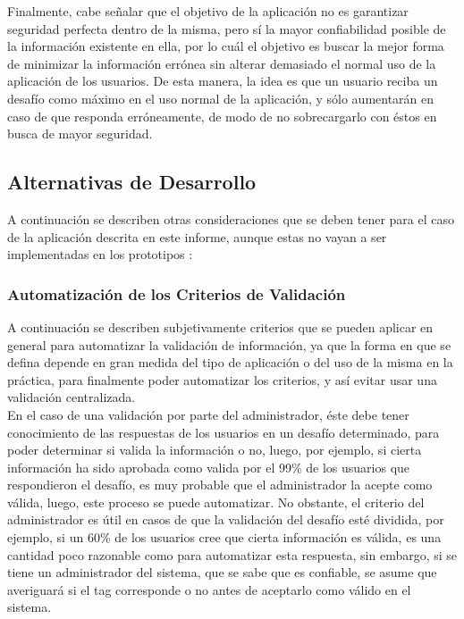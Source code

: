 \documentclass[10pt,letterpaper]{article}
\begin{document}
Finalmente, cabe señalar que el objetivo de la aplicación no es garantizar seguridad perfecta dentro de la misma, pero sí la mayor confiabilidad posible de la información existente en ella, por lo cuál el objetivo es buscar la mejor forma de minimizar la información errónea sin alterar demasiado el normal uso de la aplicación de los usuarios. De esta manera, la idea es que un usuario reciba un desafío como máximo en el uso normal de la aplicación, y sólo aumentarán en caso de que responda erróneamente, de modo de no sobrecargarlo con éstos en busca de mayor seguridad.

\subsection{Alternativas de Desarrollo}

A continuación se describen otras consideraciones que se deben tener para el caso de la aplicación descrita en este informe, aunque estas no vayan a ser implementadas en los prototipos :\\

\subsubsection{Automatización de los Criterios de Validación}

A continuación se describen subjetivamente criterios que se pueden aplicar en general para automatizar la validación de información, ya que la forma en que se defina depende en gran medida del tipo de aplicación o del uso de la misma en la práctica, para finalmente poder automatizar los criterios, y así evitar usar una validación centralizada.\\

En el caso de una validación por parte del administrador, éste debe tener conocimiento de las respuestas de los usuarios en un desafío determinado, para poder determinar si valida la información o no, luego, por ejemplo, si cierta información ha sido aprobada como valida por el 99\% de los usuarios que respondieron el desafío, es muy probable que el administrador la acepte como válida, luego, este proceso se puede automatizar. No obstante, el criterio del administrador es útil en casos de que la validación del desafío esté dividida, por ejemplo, si un 60\% de los usuarios cree que cierta información es válida, es una cantidad poco razonable como para automatizar esta respuesta, sin embargo, si se tiene un administrador del sistema, que se sabe que es confiable, se asume que averiguará si el tag corresponde o no antes de aceptarlo como válido en el sistema.\\
\end{document}
